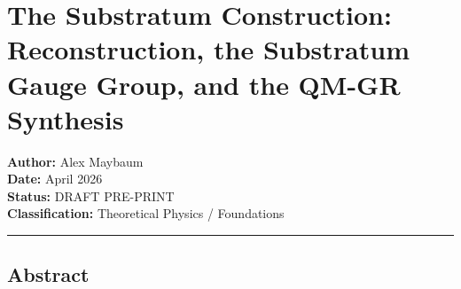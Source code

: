 \documentclass[
]{article}
\author{}
\date{}
\begin{document}
\hypertarget{the-substratum-construction-reconstruction-the-substratum-gauge-group-and-the-qm-gr-synthesis}{%
\section{The Substratum Construction: Reconstruction, the Substratum
Gauge Group, and the QM-GR
Synthesis}\label{the-substratum-construction-reconstruction-the-substratum-gauge-group-and-the-qm-gr-synthesis}}

\textbf{Author:} Alex Maybaum\\
\textbf{Date:} April 2026\\
\textbf{Status:} DRAFT PRE-PRINT\\
\textbf{Classification:} Theoretical Physics / Foundations

\begin{center}\rule{0.5\linewidth}{0.5pt}\end{center}

\hypertarget{abstract}{%
\subsection{Abstract}\label{abstract}}
\end{document}
